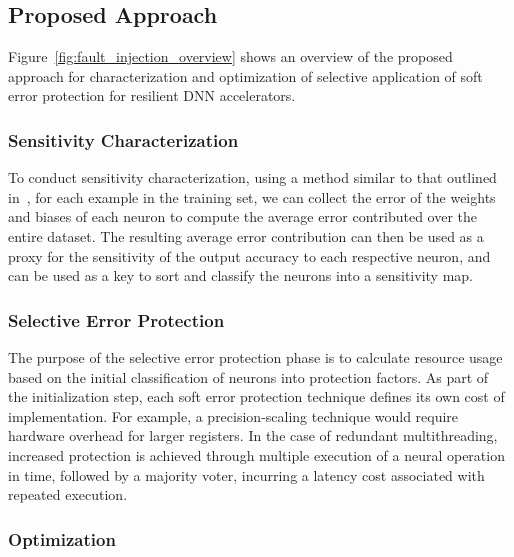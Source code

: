 \subsection{Proposed Approach}

Figure~\ref{fig:fault_injection_overview} shows an overview of the proposed approach for characterization and optimization of selective application of soft error protection for resilient DNN accelerators.

\subsubsection{Sensitivity Characterization}

To conduct sensitivity characterization, using a method similar to that outlined in~\cite{venkataramani2014axnn}, for each example in the training set, we can collect the error of the weights and biases of each neuron to compute the average error contributed over the entire dataset.
The resulting average error contribution can then be used as a proxy for the sensitivity of the output accuracy to each respective neuron, and can be used as a key to sort and classify the neurons into a sensitivity map.

\subsubsection{Selective Error Protection}

The purpose of the selective error protection phase is to calculate resource usage based on the initial classification of neurons into protection factors.
As part of the initialization step, each soft error protection technique defines its own cost of implementation.
For example, a precision-scaling technique would require hardware overhead for larger registers.
In the case of redundant multithreading, increased protection is achieved through multiple execution of a neural operation in time, followed by a majority voter, incurring a latency cost associated with repeated execution.

\subsubsection{Optimization}

